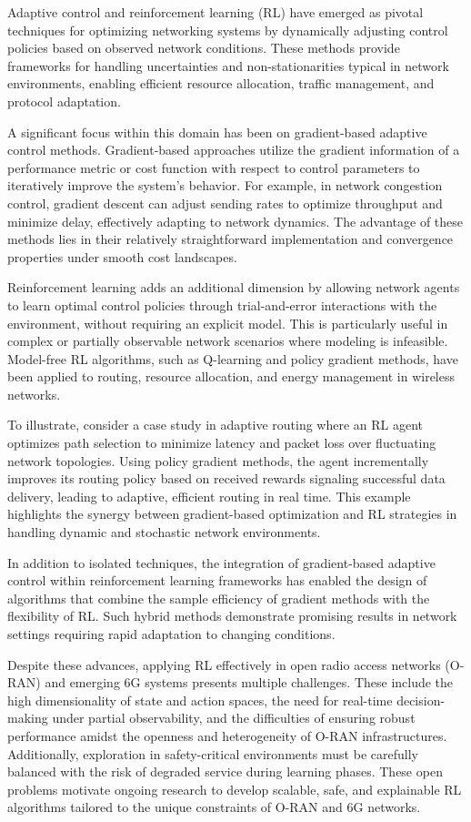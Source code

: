 \documentclass[sigconf]{acmart}
\begin{document}
Adaptive control and reinforcement learning (RL) have emerged as pivotal techniques for optimizing networking systems by dynamically adjusting control policies based on observed network conditions. These methods provide frameworks for handling uncertainties and non-stationarities typical in network environments, enabling efficient resource allocation, traffic management, and protocol adaptation.

A significant focus within this domain has been on gradient-based adaptive control methods. Gradient-based approaches utilize the gradient information of a performance metric or cost function with respect to control parameters to iteratively improve the system's behavior. For example, in network congestion control, gradient descent can adjust sending rates to optimize throughput and minimize delay, effectively adapting to network dynamics. The advantage of these methods lies in their relatively straightforward implementation and convergence properties under smooth cost landscapes.

Reinforcement learning adds an additional dimension by allowing network agents to learn optimal control policies through trial-and-error interactions with the environment, without requiring an explicit model. This is particularly useful in complex or partially observable network scenarios where modeling is infeasible. Model-free RL algorithms, such as Q-learning and policy gradient methods, have been applied to routing, resource allocation, and energy management in wireless networks.

To illustrate, consider a case study in adaptive routing where an RL agent optimizes path selection to minimize latency and packet loss over fluctuating network topologies. Using policy gradient methods, the agent incrementally improves its routing policy based on received rewards signaling successful data delivery, leading to adaptive, efficient routing in real time. This example highlights the synergy between gradient-based optimization and RL strategies in handling dynamic and stochastic network environments.

In addition to isolated techniques, the integration of gradient-based adaptive control within reinforcement learning frameworks has enabled the design of algorithms that combine the sample efficiency of gradient methods with the flexibility of RL. Such hybrid methods demonstrate promising results in network settings requiring rapid adaptation to changing conditions.

Despite these advances, applying RL effectively in open radio access networks (O-RAN) and emerging 6G systems presents multiple challenges. These include the high dimensionality of state and action spaces, the need for real-time decision-making under partial observability, and the difficulties of ensuring robust performance amidst the openness and heterogeneity of O-RAN infrastructures. Additionally, exploration in safety-critical environments must be carefully balanced with the risk of degraded service during learning phases. These open problems motivate ongoing research to develop scalable, safe, and explainable RL algorithms tailored to the unique constraints of O-RAN and 6G networks.
\end{document}
